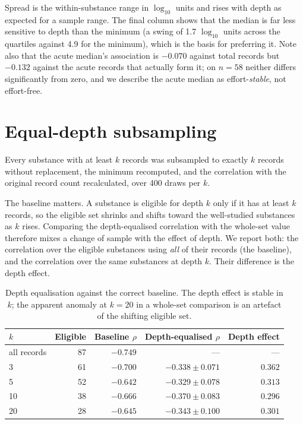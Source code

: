 \documentclass[11pt]{article}
\begin{document}
Spread is the within-substance range in $\log_{10}$ units and rises with depth
as expected for a sample range. The final column shows that the median is far
less sensitive to depth than the minimum (a swing of 1.7 $\log_{10}$ units
across the quartiles against 4.9 for the minimum), which is the basis for
preferring it. Note also that the acute median's association is $-0.070$
against total records but $-0.132$ against the acute records that actually
form it; on $n=58$ neither differs significantly from zero, and we describe the
acute median as effort-\emph{stable}, not effort-free.

\section{Equal-depth subsampling}

Every substance with at least $k$ records was subsampled to exactly $k$ records
without replacement, the minimum recomputed, and the correlation with the
original record count recalculated, over 400 draws per $k$.

The baseline matters. A substance is eligible for depth $k$ only if it has at
least $k$ records, so the eligible set shrinks and shifts toward the
well-studied substances as $k$ rises. Comparing the depth-equalised correlation
with the whole-set value therefore mixes a change of sample with the effect of
depth. We report both: the correlation over the eligible substances using
\emph{all} of their records (the baseline), and the correlation over the same
substances at depth $k$. Their difference is the depth effect.

\begin{table}[h]
\centering
\caption{Depth equalisation against the correct baseline. The depth effect is
stable in $k$; the apparent anomaly at $k=20$ in a whole-set comparison is an
artefact of the shifting eligible set.}
\small
\begin{tabular}{lrrrr}
\toprule
$k$ & Eligible & Baseline $\rho$ & Depth-equalised $\rho$ & Depth effect \\
\midrule
all records & 87 & $-0.749$ & --- & --- \\
3  & 61 & $-0.700$ & $-0.338\pm0.071$ & $0.362$ \\
5  & 52 & $-0.642$ & $-0.329\pm0.078$ & $0.313$ \\
10 & 38 & $-0.666$ & $-0.370\pm0.083$ & $0.296$ \\
20 & 28 & $-0.645$ & $-0.343\pm0.100$ & $0.301$ \\
\bottomrule
\end{tabular}
\end{table}
\end{document}
